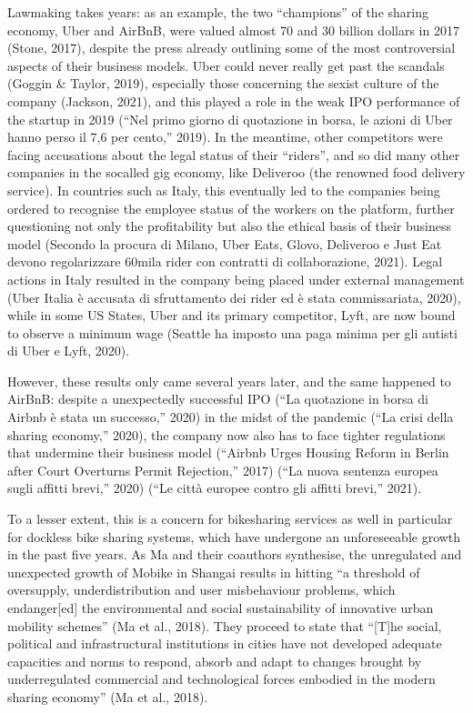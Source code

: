 \documentclass[letterpaper,10pt,english]{jupyterBook}
\begin{document}
\sphinxAtStartPar
Lawmaking takes years: as an example, the two “champions” of the sharing economy, Uber and AirBnB, were valued almost 70 and 30 billion dollars in 2017 (Stone, 2017), despite the press already outlining some of the most controversial aspects of their business models. Uber could never really get past the scandals (Goggin \& Taylor, 2019), especially those concerning the sexist culture of the company (Jackson, 2021), and this played a role in the weak IPO performance of the startup in 2019 (“Nel primo giorno di quotazione in borsa, le azioni di Uber hanno perso il 7,6 per cento,” 2019). In the meantime, other competitors were facing accusations about the legal status of their “riders”, and so did many other companies in the so\sphinxhyphen{}called gig economy, like Deliveroo (the renowned food delivery service). In countries such as Italy, this eventually led to the companies being ordered to recognise the employee status of the workers on the platform, further questioning not only the profitability but also the ethical basis of their business model (Secondo la procura di Milano, Uber Eats, Glovo, Deliveroo e Just Eat devono regolarizzare 60mila rider con contratti di collaborazione, 2021). Legal actions in Italy resulted in the company being placed under external management (Uber Italia è accusata di sfruttamento dei rider ed è stata commissariata, 2020), while in some US States, Uber and its primary competitor, Lyft, are now bound to observe a minimum wage (Seattle ha imposto una paga minima per gli autisti di Uber e Lyft, 2020).

\sphinxAtStartPar
However, these results only came several years later, and the same happened to AirBnB: despite a unexpectedly successful IPO (“La quotazione in borsa di Airbnb è stata un successo,” 2020) in the midst of the pandemic (“La crisi della sharing economy,” 2020), the company now also has to face tighter regulations that undermine their business model (“Airbnb Urges Housing Reform in Berlin after Court Overturns Permit Rejection,” 2017) (“La nuova sentenza europea sugli affitti brevi,” 2020) (“Le città europee contro gli affitti brevi,” 2021).

\sphinxAtStartPar
To a lesser extent, this is a concern for bike\sphinxhyphen{}sharing services as well \sphinxhyphen{} in particular for dockless bike sharing systems, which have undergone an unforeseeable growth in the past five years. As Ma and their coauthors synthesise, the unregulated and unexpected growth of Mobike in Shangai results in hitting “a threshold of oversupply, under\sphinxhyphen{}distribution and user misbehaviour problems, which endanger{[}ed{]} the environmental and social sustainability of innovative urban mobility schemes” (Ma et al., 2018). They proceed to state that “{[}T{]}he social, political and infrastructural institutions in cities have not developed adequate capacities and norms to respond, absorb and adapt to changes brought by under\sphinxhyphen{}regulated commercial and technological forces embodied in the modern sharing economy” (Ma et al., 2018).
\end{document}
